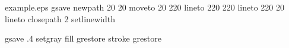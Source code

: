 %
%
%
%
\begin{filecontents*}{example.eps}
gsave
newpath
  20 20 moveto
  20 220 lineto
  220 220 lineto
  220 20 lineto
closepath
2 setlinewidth

gsave
  .4 setgray fill
grestore
stroke
grestore
\end{filecontents*}
%
\RequirePackage{fix-cm}
%
\documentclass[twocolumn]{svjour3}          %
%
\smartqed  %
%
\usepackage{graphicx}
\usepackage{natbib}
\usepackage{multirow}
\usepackage{rotating}
\usepackage{lscape}
\usepackage{pdflscape}
\usepackage[table]{xcolor} 
\usepackage{pifont}
\usepackage{longtable}
\usepackage{endnotes}
\usepackage{ctable}
\usepackage{pifont}
\usepackage{supertabular}
\usepackage{multirow}




\usepackage{soul}
\usepackage{amsmath,amssymb}
\usepackage{upgreek}
\usepackage{mathtools}
\usepackage[export]{adjustbox}


%
%
%

